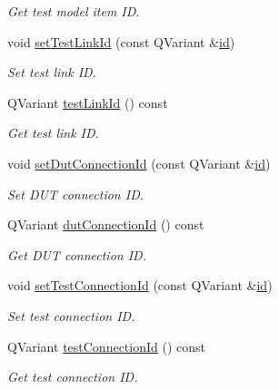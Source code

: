 \begin{DoxyCompactItemize}
\begin{DoxyCompactList}\small\item\em Get test model item I\-D. \end{DoxyCompactList}\item 
void \hyperlink{classmdt_tt_test_model_item_route_data_a6255e53365aceedba51858172b3622ca}{set\-Test\-Link\-Id} (const Q\-Variant \&\hyperlink{classmdt_tt_test_model_item_route_data_ad34638a6361e64a867f30821b73ff385}{id})
\begin{DoxyCompactList}\small\item\em Set test link I\-D. \end{DoxyCompactList}\item 
Q\-Variant \hyperlink{classmdt_tt_test_model_item_route_data_a7c58642d4e7ef24dac1d27f7e4be41ee}{test\-Link\-Id} () const 
\begin{DoxyCompactList}\small\item\em Get test link I\-D. \end{DoxyCompactList}\item 
void \hyperlink{classmdt_tt_test_model_item_route_data_a39994d10e123601443fed05a5968bf02}{set\-Dut\-Connection\-Id} (const Q\-Variant \&\hyperlink{classmdt_tt_test_model_item_route_data_ad34638a6361e64a867f30821b73ff385}{id})
\begin{DoxyCompactList}\small\item\em Set D\-U\-T connection I\-D. \end{DoxyCompactList}\item 
Q\-Variant \hyperlink{classmdt_tt_test_model_item_route_data_afd8421d44dd279d2276cdf0aacfe8f6f}{dut\-Connection\-Id} () const 
\begin{DoxyCompactList}\small\item\em Get D\-U\-T connection I\-D. \end{DoxyCompactList}\item 
void \hyperlink{classmdt_tt_test_model_item_route_data_afdaa11c1608e78d7dc888e369b4d88cd}{set\-Test\-Connection\-Id} (const Q\-Variant \&\hyperlink{classmdt_tt_test_model_item_route_data_ad34638a6361e64a867f30821b73ff385}{id})
\begin{DoxyCompactList}\small\item\em Set test connection I\-D. \end{DoxyCompactList}\item 
Q\-Variant \hyperlink{classmdt_tt_test_model_item_route_data_af19d1c8c5050a14ab7e55700544877d5}{test\-Connection\-Id} () const 
\begin{DoxyCompactList}\small\item\em Get test connection I\-D. \end{DoxyCompactList}\item 

\end{DoxyCompactItemize}
